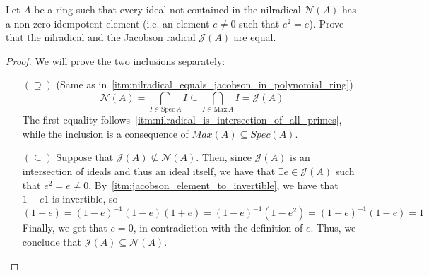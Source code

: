 \begin{problem}
    Let $A$ be a ring such that every ideal not contained in the nilradical $\mathcal{N}(A)$ has a non-zero idempotent element (i.e. an element $e \neq 0$ such that $e^2 = e$).
    Prove that the nilradical and the Jacobson radical $\mathcal{J}(A)$ are equal.
    \begin{sol}
        \begin{proof}
            We will prove the two inclusions separately:
                \begin{itemize}
                    \item[$(\supseteq)$]
                    (Same as in~\ref{itm:nilradical_equals_jacobson_in_polynomial_ring})
                    \[ \mathcal{N}(A) = \bigcap_{I \in \text{Spec}\,A} I \subseteq \bigcap_{I \in \text{Max}\,A} I = \mathcal{J}(A) \]
                    The first equality follows~\ref{itm:nilradical_is_intersection_of_all_primes}, while the inclusion is a consequence of $Max(A) \subseteq Spec(A)$.
                    \item[$(\subseteq)$]
                    Suppose that $\mathcal{J}(A) \nsubseteq \mathcal{N}(A)$.
                    Then, since $\mathcal{J}(A)$ is an intersection of ideals and thus an ideal itself, we have that $\exists e \in \mathcal{J}(A)$ such that $e^2 = e \neq 0$.
                    By~\ref{itm:jacobson_element_to_invertible}, we have that $1 - e 1$ is invertible, so
                    \[ (1 + e) = (1 - e)^{-1}(1 - e)(1 + e) = (1 - e)^{-1}(1 - e^2) = (1 - e)^{-1}(1 - e) = 1 \]
                    Finally, we get that $e = 0$, in contradiction with the definition of $e$.
                    Thus, we conclude that $\mathcal{J}(A) \subseteq \mathcal{N}(A)$.
                \end{itemize}
        \end{proof}
    \end{sol}
\end{problem}